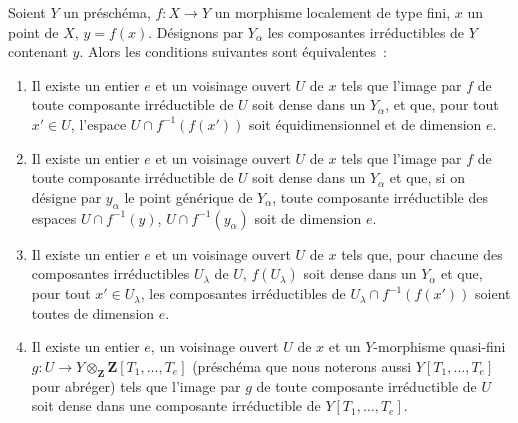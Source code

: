 \begin{proposition}[13.3.1]
\label{IV.13.3.1-fr}
Soient $Y$ un préschéma, $f:X\to Y$ un morphisme localement de type fini,
$x$ un point de $X$, $y=f(x)$. Désignons par $Y_\alpha$ les composantes
irréductibles de $Y$ contenant $y$. Alors les conditions suivantes sont
équivalentes~:
\begin{enumerate}[label=\emph{\alph*)}]
  \item Il existe un entier $e$ et un voisinage ouvert $U$ de $x$ tels que
  l'image par $f$ de toute composante irréductible de $U$ soit dense dans un
  $Y_\alpha$, et que, pour tout $x'\in U$, l'espace
  $U\cap f^{-1}(f(x'))$ soit équidimensionnel et de dimension $e$.
  \item[\emph{a$'$)}] Il existe un entier $e$ et un voisinage ouvert $U$ de
  $x$ tels que l'image par $f$ de toute composante irréductible de $U$ soit
  dense dans un $Y_\alpha$ et que, si on désigne par $y_\alpha$ le point
  générique de $Y_\alpha$, toute composante irréductible des espaces
  $U\cap f^{-1}(y)$, $U\cap f^{-1}(y_\alpha)$ soit de dimension $e$.
  \item[\emph{a$''$)}] Il existe un entier $e$ et un voisinage ouvert $U$ de
  $x$ tels que, pour chacune des composantes irréductibles $U_\lambda$ de
  $U$, $f(U_\lambda)$ soit dense dans un $Y_\alpha$ et que, pour tout
  $x'\in U_\lambda$, les composantes irréductibles de
  $U_\lambda\cap f^{-1}(f(x'))$ soient toutes de dimension $e$.
  \item Il existe un entier $e$, un voisinage ouvert $U$ de $x$ et un
  $Y$-morphisme \textup{quasi-fini}
  $g:U\longrightarrow Y\otimes_{\mathbf Z}\mathbf Z[T_1,\ldots,T_e]$
  \textup{(préschéma que nous noterons aussi $Y[T_1,\ldots,T_e]$ pour abréger)} tels
  que l'image par $g$ de toute composante irréductible de $U$ soit dense dans
  une composante irréductible de $Y[T_1,\ldots,T_e]$.
\end{enumerate}
\end{proposition}

